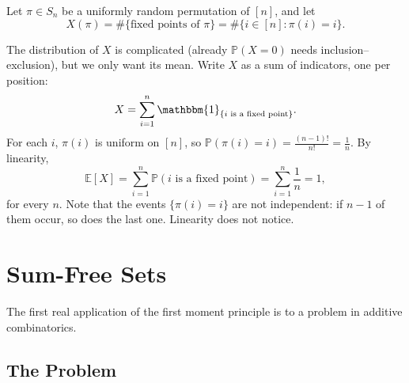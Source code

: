 \begin{eg}\label{eg:fixed-points}
    Let \(\pi \in S_n\) be a uniformly random permutation of \([n]\), and let
    \[
        X(\pi) = \#\{\text{fixed points of } \pi\} = \#\{ i \in [n] : \pi(i) = i \}.
    \]
    \begin{center}
    \end{center}
    The distribution of \(X\) is complicated (already \(\mathbb{P}(X = 0)\) needs inclusion--exclusion), but we only want its mean. Write \(X\) as a sum of indicators, one per position:
    \[
        X = \sum_{i=1}^{n} \mathbbm{1}_{\{i \text{ is a fixed point}\}}.
    \]
    For each \(i\), \(\pi(i)\) is uniform on \([n]\), so \(\mathbb{P}(\pi(i) = i) = \frac{(n-1)!}{n!} = \frac{1}{n}\). By linearity,
    \[
        \mathbb{E}[X] = \sum_{i=1}^{n} \mathbb{P}(i \text{ is a fixed point}) = \sum_{i=1}^{n} \frac{1}{n} = 1,
    \]
    for every \(n\). Note that the events \(\{\pi(i) = i\}\) are not independent: if \(n - 1\) of them occur, so does the last one. Linearity does not notice.
\end{eg}

\section{Sum-Free Sets}\label{sec:sum-free}

The first real application of the first moment principle is to a problem in additive combinatorics.

\subsection{The Problem}

